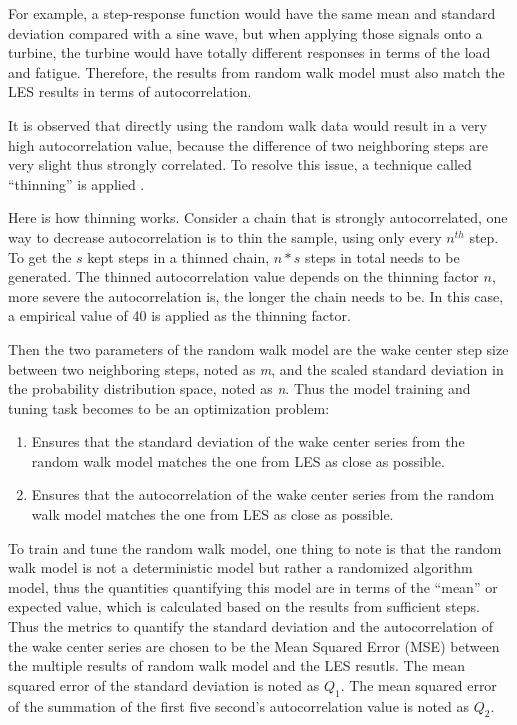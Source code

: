 \documentclass{umthesis}
\begin{document}
For example, a step-response function would have the same mean and standard deviation compared with a sine wave, but when applying those signals onto a turbine, the turbine would have totally different responses in terms of the load and fatigue. Therefore, the results from random walk model must also match the LES results in terms of autocorrelation.

It is observed that directly using the random walk data would result in a very high autocorrelation value, because the difference of two neighboring steps are very slight thus strongly correlated. To resolve this issue, a technique called ``thinning'' is applied \cite{thinning}.

Here is how thinning works. Consider a chain that is strongly autocorrelated, one way to decrease autocorrelation is to thin the sample, using only every $n^{th}$ step. To get the $s$ kept steps in a thinned chain, $n*s$ steps in total needs to be generated. The thinned autocorrelation value depends on the thinning factor $n$, more severe the autocorrelation is, the longer the chain needs to be. In this case, a empirical value of 40 is applied as the thinning factor.         

Then the two parameters of the random walk model are the wake center step size between two neighboring steps, noted as \textit{m}, and the scaled standard deviation in the probability distribution space, noted as \textit{n}. Thus the model training and tuning task becomes to be an optimization problem:

\begin{enumerate}
  \item Ensures that the standard deviation of the wake center series from the random walk model matches the one from LES as close as possible. 
  \item Ensures that the autocorrelation of the wake center series from the random walk model matches the one from LES as close as possible. 
\end{enumerate}

To train and tune the random walk model, one thing to note is that the random walk model is not a deterministic model but rather a randomized algorithm model, thus the quantities quantifying this model are in terms of the ``mean'' or expected value, which is calculated based on the results from sufficient steps. Thus the metrics to quantify the standard deviation and the autocorrelation of the wake center series are chosen to be the Mean Squared Error (MSE) between the multiple results of random walk model and the LES resutls. The mean squared error of the standard deviation is noted as $Q_1$. The mean squared error of the summation of the first five second’s autocorrelation value is noted as $Q_2$.
\end{document}

